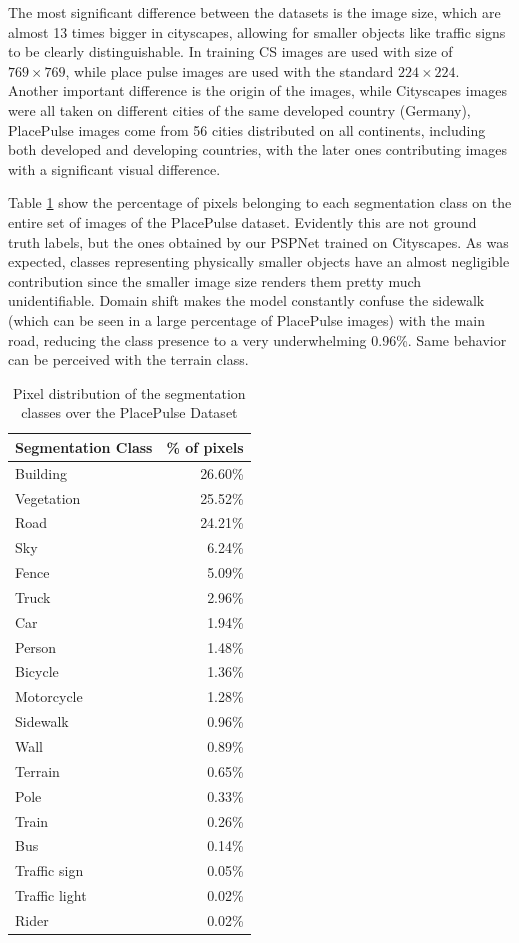 The most significant difference between the datasets is the image size, which are almost 13
times bigger in cityscapes, allowing for smaller objects like traffic signs to be clearly
distinguishable. In training CS images are used with size of $769 \times 769$, while
place pulse images are used with the standard $224\times224$. Another important difference
is the origin of the images, while Cityscapes images were all taken on different cities of
the same developed country (Germany), PlacePulse images come from 56 cities distributed on all
continents, including both developed and developing countries, with the later ones contributing
images with a significant visual difference.

Table \ref{tab:segmentation} show the percentage of pixels belonging to each segmentation class
on the entire set of images of the PlacePulse dataset. Evidently this are not ground truth labels,
but the ones obtained by our  PSPNet trained on Cityscapes. As was expected, classes representing
physically smaller objects have an almost negligible contribution since the smaller image size renders
them pretty much unidentifiable. Domain shift makes the model constantly confuse the sidewalk (which can
be seen in a large percentage of PlacePulse images) with the main road, reducing the class presence
to a very underwhelming 0.96\%. Same behavior can be perceived with the terrain class.


\begin{table}[H]
	\begin{tabular}{|l|r|} \hline
	Segmentation Class & \% of pixels \\ \hline
	Building      & 26.60\% \\
	Vegetation    & 25.52\% \\
	Road          & 24.21\% \\
	Sky           & 6.24\%  \\
	Fence         & 5.09\%  \\
	Truck         & 2.96\%  \\
	Car           & 1.94\%  \\
	Person        & 1.48\%  \\
	Bicycle       & 1.36\%  \\
	Motorcycle    & 1.28\%  \\
	Sidewalk      & 0.96\%  \\
	Wall          & 0.89\%  \\
	Terrain       & 0.65\%  \\
	Pole          & 0.33\%  \\
	Train         & 0.26\%  \\
	Bus           & 0.14\%  \\
	Traffic sign  & 0.05\%  \\
	Traffic light & 0.02\%  \\
	Rider         & 0.02\%  \\ \hline
	\end{tabular}
	\caption[Segmentation Distribution]{
		Pixel distribution of the segmentation classes over the PlacePulse Dataset
	}
	\label{tab:segmentation}
\end{table}